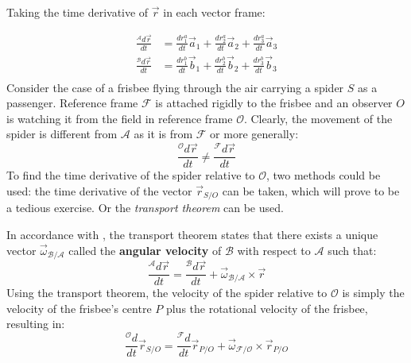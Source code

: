 \documentclass{UoNMCHA}
\numberwithin{equation}{section}
\begin{document}
Taking the time derivative of $\vec{r}$ in each vector frame:

\begin{equation}
	\begin{split}
		\frac{{}^\mathcal{A}d\vec{r}}{dt} &= \frac{dr^{a}_{1}}{dt}\vec{a}_{1} + \frac{dr^{a}_{2}}{dt}\vec{a}_{2} + \frac{dr^{a}_{3}}{dt}\vec{a}_{3}\\
		\frac{{}^\mathcal{B}d\vec{r}}{dt} &= \frac{dr^{b}_{1}}{dt}\vec{b}_{1} + \frac{dr^{b}_{2}}{dt}\vec{b}_{2} + \frac{dr^{b}_{3}}{dt}\vec{b}_{3}\\
	\end{split}
\end{equation}
Consider the case of a frisbee flying through the air carrying a spider $S$ as a passenger. Reference frame $\mathcal{F}$ is attached rigidly to the frisbee and an observer $O$ is watching it from the field in reference frame $\mathcal{O}$. Clearly, the movement of the spider is different from $\mathcal{A}$ as it is from $\mathcal{F}$ or more generally:
\begin{equation}
		\frac{{}^\mathcal{O}d\vec{r}}{dt} \neq \frac{{}^\mathcal{F}d\vec{r}}{dt}
\end{equation}
To find the time derivative of the spider relative to $\mathcal{O}$, two methods could be used: the time derivative of the vector $\vec{r}_{S/O}$ can be taken, which will prove to be a tedious exercise. Or the \textit{transport theorem} can be used.

In accordance with \cite{3900Notes}, the transport theorem states that there exists a unique vector $\vec{\omega}_{\mathcal{B}/\mathcal{A}}$ called the \textbf{angular velocity} of $\mathbf{\mathcal{B}}$ with respect to $\mathbf{\mathcal{A}}$ such that:
\begin{equation}\label{eq:transportTheorem}
	\frac{{}^\mathcal{A}d\vec{r}}{dt} = \frac{{}^\mathcal{B}d\vec{r}}{dt} + \vec{\omega}_{\mathcal{B}/\mathcal{A}}\times\vec{r}
\end{equation}
Using the transport theorem, the velocity of the spider relative to $\mathcal{O}$ is simply the velocity of the frisbee's centre $P$ plus the rotational velocity of the frisbee, resulting in:
\begin{equation}
	\frac{{}^\mathcal{O}d}{dt}\vec{r}_{S/O} = \frac{{}^\mathcal{F}d}{dt}\vec{r}_{P/O} + \vec{\omega}_{\mathcal{F}/\mathcal{O}}\times\vec{r}_{P/O}
\end{equation}
\end{document}
